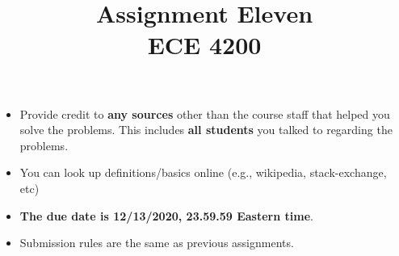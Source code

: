 \documentclass[11pt]{article}
\title{Assignment Eleven\\ ECE 4200}
\date{}
\begin{document}
\maketitle 

\begin{itemize}
\item
Provide credit to \textbf{any sources} other than the course staff that helped you solve the problems. This includes \textbf{all students} you talked to regarding the problems. 	
\item
You can look up definitions/basics online (e.g., wikipedia, stack-exchange, etc)
\item
{\bf The due date is 12/13/2020, 23.59.59 Eastern time}. 
\item
Submission rules are the same as previous assignments.
\end{itemize}
\end{document}
